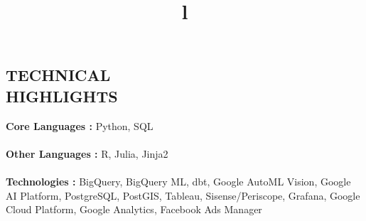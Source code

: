 \documentclass[margin]{res}
\begin{document}
\begin{resume}

\section{TECHNICAL\\HIGHLIGHTS}

\textbf{Core Languages : } Python, SQL \\
\\
\textbf{Other Languages : } R, Julia, Jinja2 \\
\\
\textbf{Technologies :} BigQuery, BigQuery ML, dbt, Google AutoML Vision, Google AI Platform, PostgreSQL, PostGIS, Tableau, Sisense/Periscope, Grafana, Google Cloud Platform, Google Analytics, Facebook Ads Manager
\\

\begin{format}
\title{l}\\
\\
\body\\
\end{format}






\end{resume}
\end{document}
